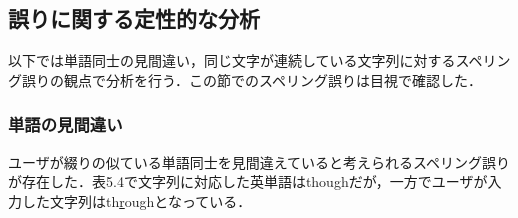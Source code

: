 \begin{comment}
\subsubsection{アルファベットに対する数字のスペリング誤り}
表5.1にはその事例を示していて，ユーザがタイピングゲームにおいて英単語ideaを入力するときにユーザが入力した文字列が13ideaであった場合があった．これはそれぞれiと1，dと3の視覚的混同によって起きたものであると考えられる．しかし英単語を入力するという設定のタイピングゲームにおいて，数字を入力することは考えにくい．しかしタイピングゲームではハイスコアを競う設定がされているので，競うようなユーザが焦るような状況においては，視覚的混同のようなスペリング誤りを引き起こす要因が高まると考えられる．
\end{comment}

\begin{comment}
表5.3と表5.4は上位10件の置換前の文字と置換後の文字のペアを示している．表5.3と表5.4を比較すると，表5.3においてxとc，vとc，jとhなど隣接するキー配置による打鍵誤りからもたらされるスペリング誤りが10件中8件見られ，表5.4ではzとs，xとsのような打鍵誤りからもたらされるスペリング誤りが10件中4件見られタイピングゲームを用いたスペリング誤りと通常のスペリング誤りで違いが見られた．表5.3においてbとvの置換もよく見られ，このスペリング誤りの原因は打鍵誤りによるものと日本人特有のローマ字の使用による影響と考えられるが，同じくローマ字の使用による影響によって起きるrとlの置換は表5.1に示すように本研究においてはあまり起こらなかったため，タイピングゲームのような表示された文字を書き写す状況ではローマ字の使用による影響をあまり受けず，打鍵誤りにより引き起こされる置換が通常のスペリング誤りに比べよく起きることが示唆された．
\end{comment}

\subsection{誤りに関する定性的な分析}

以下では単語同士の見間違い，同じ文字が連続している文字列に対するスペリング誤りの観点で分析を行う．この節でのスペリング誤りは目視で確認した．

\subsubsection{単語の見間違い}
ユーザが綴りの似ている単語同士を見間違えていると考えられるスペリング誤りが存在した．表5.4で文字列に対応した英単語はthoughだが，一方でユーザが入力した文字列はth\underline{r}oughとなっている．
\begin{comment}
これは本研究のようにユーザが入力しようとしている文字列がわからなければ抽出できない事例である．
またWheelerの研究\cite{wheeler1970processes}において人間は単語を文字や音素のような要素を逐次処理することで認識するのではなく，分けられない単体として認識している可能性があることが指摘されており，この事例はそれに伴った結果であると考えられる．
\end{comment}


